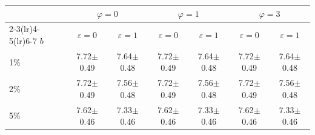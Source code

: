 \begin{tabular}{lcccccc}
\toprule
 & \multicolumn{2}{c}{$\varphi{=}0$} & \multicolumn{2}{c}{$\varphi{=}1$} & \multicolumn{2}{c}{$\varphi{=}3$} \\
\cmidrule(lr){2-3}\cmidrule(lr){4-5}\cmidrule(lr){6-7}
$b$ & $\varepsilon{=}0$ & $\varepsilon{=}1$ & $\varepsilon{=}0$ & $\varepsilon{=}1$ & $\varepsilon{=}0$ & $\varepsilon{=}1$ \\
\midrule
1\% & 7.72$\pm$0.49 & 7.64$\pm$0.48 & 7.72$\pm$0.49 & 7.64$\pm$0.48 & 7.72$\pm$0.49 & 7.64$\pm$0.48 \\
2\% & 7.72$\pm$0.49 & 7.56$\pm$0.48 & 7.72$\pm$0.49 & 7.56$\pm$0.48 & 7.72$\pm$0.49 & 7.56$\pm$0.48 \\
5\% & 7.62$\pm$0.46 & 7.33$\pm$0.46 & 7.62$\pm$0.46 & 7.33$\pm$0.46 & 7.62$\pm$0.46 & 7.33$\pm$0.46 \\
\bottomrule
\end{tabular}
